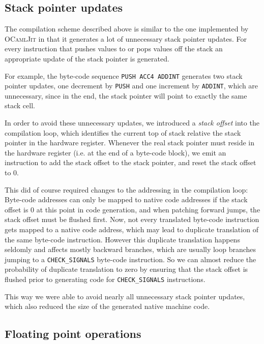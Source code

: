 \documentclass[a4paper]{acm_proc_article-sp}
\begin{document}
\subsection{Stack pointer updates}

The compilation scheme described above is similar to the one implemented by \textsc{OCamlJit}
in that it generates a lot of unnecessary stack pointer updates. For every instruction
that pushes values to or pops values off the stack an appropriate update of the stack
pointer is generated.

For example, the byte-code sequence \texttt{PUSH\,ACC4\,ADDINT} generates two stack pointer
updates, one decrement by \texttt{PUSH} and one increment by \texttt{ADDINT}, which are
unnecessary, since in the end, the stack pointer will point to exactly the same stack cell.

In order to avoid these unnecessary updates, we introduced a \emph{stack offset} into
the compilation loop, which identifies the current top of stack relative the stack
pointer in the hardware register. Whenever the real stack pointer must reside in the
hardware register (i.e. at the end of a byte-code block), we emit an instruction to
add the stack offset to the stack pointer, and reset the stack offset to $0$.

This did of course required changes to the addressing in the compilation loop: 
Byte-code addresses can only be mapped to native code addresses if the stack
offset is $0$ at this point in code generation, and when patching forward jumps,
the stack offset must be flushed first. Now, not every translated byte-code
instruction gets mapped to a native code address, which may lead to duplicate
translation of the same byte-code instruction. However this duplicate
translation happens seldomly and affects mostly backward branches, which are
usually loop branches jumping to a \texttt{CHECK\_SIGNALS} byte-code instruction.
So we can almost reduce the probability of duplicate translation to zero by
ensuring that the stack offset is flushed prior to generating code for \texttt{CHECK\_SIGNALS}
instructions.

This way we were able to avoid nearly all unnecessary stack pointer updates, which
also reduced the size of the generated native machine code.

\subsection{Floating point operations}
\end{document}
